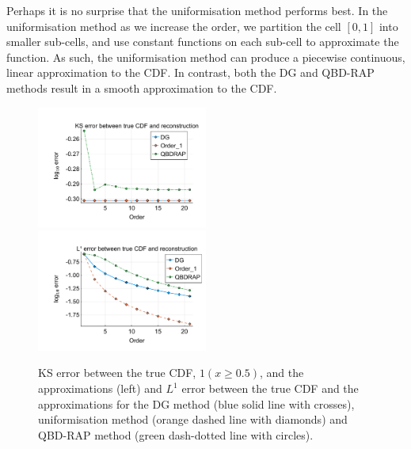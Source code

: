 Perhaps it is no surprise that the uniformisation method performs best. In the uniformisation method as we increase the order, we partition the cell \([0,1]\) into smaller sub-cells, and use constant functions on each sub-cell to approximate the function. As such, the uniformisation method can produce a piecewise continuous, linear approximation to the CDF. In contrast, both the DG and QBD-RAP methods result in a smooth approximation to the CDF. 
\begin{figure}
	\centering
	\includegraphics[width=0.5\textwidth,trim={1.25cm 0.8cm 0.25cm 1.25cm},clip]{chapter5/figs/comp/fun1/meshs_ks_error_formatted.pdf}%
	\includegraphics[width=0.5\textwidth,trim={1.25cm 0.8cm 0.25cm 1.25cm},clip]{chapter5/figs/comp/fun1/meshs_l1_cdf_error_formatted.pdf}
	\caption{KS error between the true CDF, \(1(x\geq 0.5)\), and the approximations (left) and \(L^1\) error between the true CDF and the approximations for the DG method (blue solid line with crosses), uniformisation method (orange dashed line with diamonds) and QBD-RAP method (green dash-dotted line with circles).}
	\label{fig: fun 1 comp} 
\end{figure}

